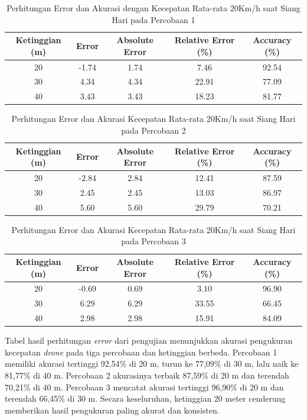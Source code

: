 \begin{table}[H]
\centering
\caption{Perhitungan Error dan Akurasi dengan Kecepatan Rata-rata 20Km/h saat Siang Hari pada Percobaan 1}
\label{table:error_accuracy_titik1}
\begin{tabular}{|c|c|c|c|c|}
\hline
\textbf{Ketinggian (m)} & \textbf{Error} & \textbf{Absolute Error} & \textbf{Relative Error (\%)} & \textbf{Accuracy (\%)} \\ \hline
20 & -1.74 & 1.74 & 7.46 & 92.54 \\
30 & 4.34 & 4.34 & 22.91 & 77.09 \\
40 & 3.43 & 3.43 & 18.23 & 81.77 \\ \hline
\end{tabular}
\end{table}
\vspace{-3ex}
\begin{table}[H]
\centering
\caption{Perhitungan Error dan Akurasi Kecepatan Rata-rata 20Km/h saat Siang Hari pada Percobaan 2}
\label{table:error_accuracy_titik2}
\begin{tabular}{|c|c|c|c|c|}
\hline
\textbf{Ketinggian (m)} & \textbf{Error} & \textbf{Absolute Error} & \textbf{Relative Error (\%)} & \textbf{Accuracy (\%)} \\ \hline
20 & -2.84 & 2.84 & 12.41 & 87.59 \\
30 & 2.45 & 2.45 & 13.03 & 86.97 \\
40 & 5.60 & 5.60 & 29.79 & 70.21 \\ \hline
\end{tabular}
\end{table}
\vspace{-3ex}
\begin{table}[H]
\centering
\caption{Perhitungan Error dan Akurasi Kecepatan Rata-rata 20Km/h saat Siang Hari pada Percobaan 3}
\label{table:error_accuracy_titik3}
\begin{tabular}{|c|c|c|c|c|}
\hline
\textbf{Ketinggian (m)} & \textbf{Error} & \textbf{Absolute Error} & \textbf{Relative Error (\%)} & \textbf{Accuracy (\%)} \\ \hline
20 & -0.69 & 0.69 & 3.10 & 96.90 \\
30 & 6.29 & 6.29 & 33.55 & 66.45 \\
40 & 2.98 & 2.98 & 15.91 & 84.09 \\ \hline
\end{tabular}
\end{table}
Tabel hasil perhitungan \emph{error} dari pengujian menunjukkan akurasi pengukuran kecepatan \emph{drone} pada tiga percobaan dan ketinggian berbeda. Percobaan 1 memiliki akurasi tertinggi 92,54\% di 20 m, turun ke 77,09\% di 30 m, lalu naik ke 81,77\% di 40 m. Percobaan 2 akurasinya terbaik 87,59\% di 20 m dan terendah 70,21\% di 40 m. Percobaan 3 mencatat akurasi tertinggi 96,90\% di 20 m dan terendah 66,45\% di 30 m. Secara keseluruhan, ketinggian 20 meter cenderung memberikan hasil pengukuran paling akurat dan konsisten.

